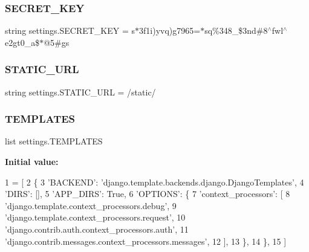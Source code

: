 \mbox{\label{namespacesettings_a6f650cb2157a59f325b7e32be1fcef7c}} 
\subsubsection{\texorpdfstring{S\+E\+C\+R\+E\+T\+\_\+\+K\+EY}{SECRET\_KEY}}
{\footnotesize\ttfamily string settings.\+S\+E\+C\+R\+E\+T\+\_\+\+K\+EY = \textquotesingle{}s$\ast$3f1i)yvq)g7965=$\ast$sq\%348\+\_\+\$3nd\#8$^\wedge$fwl$^\wedge$e2gt0\+\_\+a\$$\ast$@5\#gs\textquotesingle{}}

\mbox{\label{namespacesettings_a24fead837ac9daa5070672c6d5137988}} 
\subsubsection{\texorpdfstring{S\+T\+A\+T\+I\+C\+\_\+\+U\+RL}{STATIC\_URL}}
{\footnotesize\ttfamily string settings.\+S\+T\+A\+T\+I\+C\+\_\+\+U\+RL = \textquotesingle{}/static/\textquotesingle{}}

\mbox{\label{namespacesettings_ae968cb696c7e13582bb44c74a0447af4}} 
\subsubsection{\texorpdfstring{T\+E\+M\+P\+L\+A\+T\+ES}{TEMPLATES}}
{\footnotesize\ttfamily list settings.\+T\+E\+M\+P\+L\+A\+T\+ES}

{\bfseries Initial value\+:}
\begin{DoxyCode}
1 =  [
2     \{
3         \textcolor{stringliteral}{'BACKEND'}: \textcolor{stringliteral}{'django.template.backends.django.DjangoTemplates'},
4         \textcolor{stringliteral}{'DIRS'}: [],
5         \textcolor{stringliteral}{'APP\_DIRS'}: \textcolor{keyword}{True},
6         \textcolor{stringliteral}{'OPTIONS'}: \{
7             \textcolor{stringliteral}{'context\_processors'}: [
8                 \textcolor{stringliteral}{'django.template.context\_processors.debug'},
9                 \textcolor{stringliteral}{'django.template.context\_processors.request'},
10                 \textcolor{stringliteral}{'django.contrib.auth.context\_processors.auth'},
11                 \textcolor{stringliteral}{'django.contrib.messages.context\_processors.messages'},
12             ],
13         \},
14     \},
15 ]
\end{DoxyCode}
\mbox{\label{namespacesettings_a3179a25adef9f828e832d782a072b662}} 
